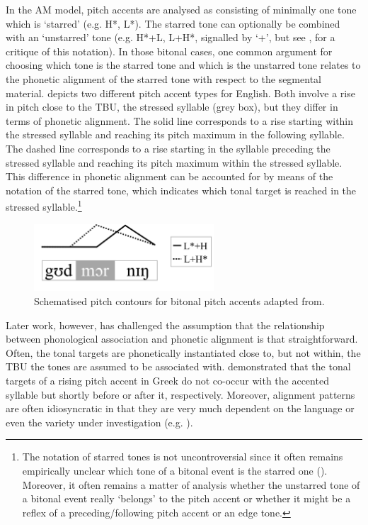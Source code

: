 In the AM model, pitch accents are analysed as consisting of minimally one tone which is ‘starred’ (e.g. H*, L*). The starred tone can optionally be combined with an ‘unstarred’ tone (e.g. H*+L, L+H*, signalled by ‘+’, but see \citealt{Gussenhoven2002}, for a critique of this notation). In those bitonal cases, one common argument for choosing which tone is the starred tone and which is the unstarred tone relates to the phonetic alignment of the starred tone with respect to the segmental material.  depicts two different pitch accent types for English. Both involve a rise in pitch close to the TBU, the stressed syllable (grey box), but they differ in terms of phonetic alignment. The solid line corresponds to a rise starting within the stressed syllable and reaching its pitch maximum in the following syllable. The dashed line corresponds to a rise starting in the syllable preceding the stressed syllable and reaching its pitch maximum within the stressed syllable. This difference in phonetic alignment can be accounted for by means of the notation of the starred tone, which indicates which tonal target is reached in the stressed syllable.\footnote{The notation of starred tones is not uncontroversial since it often remains empirically unclear which tone of a bitonal event is the starred one (\citealt{Arvaniti.etal2000}). Moreover, it often remains a matter of analysis whether the unstarred tone of a bitonal event really ‘belongs’ to the pitch accent or whether it might be a reflex of a preceding/following pitch accent or an edge tone.}

\begin{figure}
  \centering 
   \includegraphics[width=0.6\textwidth]{figures/Figure_2_4.png}
  \caption{Schematised pitch contours for bitonal pitch accents adapted from\citet[782]{Grice2006}.} 
   \label{fig:2.4}
   \end{figure}

Later work, however, has challenged the assumption that the relationship between phonological association and phonetic alignment is that straightforward. Often, the tonal targets are phonetically instantiated close to, but not within, the TBU the tones are assumed to be associated with. \citet{Arvaniti.etal2000} demonstrated that the tonal targets of a rising pitch accent in Greek do not co-occur with the accented syllable but shortly before or after it, respectively. Moreover, alignment patterns are often idiosyncratic in that they are very much dependent on the language or even the variety under investigation (e.g. \citealt{Muecke.etal2009}). 

